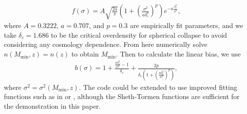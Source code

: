 \documentclass[a4paper,11pt]{article}
\begin{document}
\begin{align}\label{f_shethtormen}
f(\sigma) = A\sqrt{\frac{2a}{\pi}}\left(1+\left(\frac{\sigma^2}{a\delta_c^2}\right)^p\right)e^{-a\frac{\delta_c^2}{\sigma^2}},
\end{align}
where $A=0.3222$, $a=0.707$, and $p=0.3$ are empirically fit parameters, and we take $\delta_c=1.686$ to be the critical overdensity for spherical collapse to avoid considering any cosmology dependence. From here numerically solve $n(M_\text{min},z)=n(z)$ to obtain $M_\text{min}$. Then to calculate the linear bias, we use 
\begin{align}\label{b_shethtormen}
b(\sigma)= 1+\frac{\frac{a\delta_c^2}{\sigma^2}-1}{\delta_c}+\frac{2p}{\delta_c\left(1+\left(\frac{a\delta_c^2}{\sigma^2}\right)^p\right)},
\end{align}
where $\sigma^2=\sigma^2(M_\text{min},z)$. The code could be extended to use improved fitting functions such as in \cite{jenkins_hmf} or \cite{hmf_tinker}, although the Sheth-Tormen functions are sufficient for the demonstration in this paper.
\end{document}
